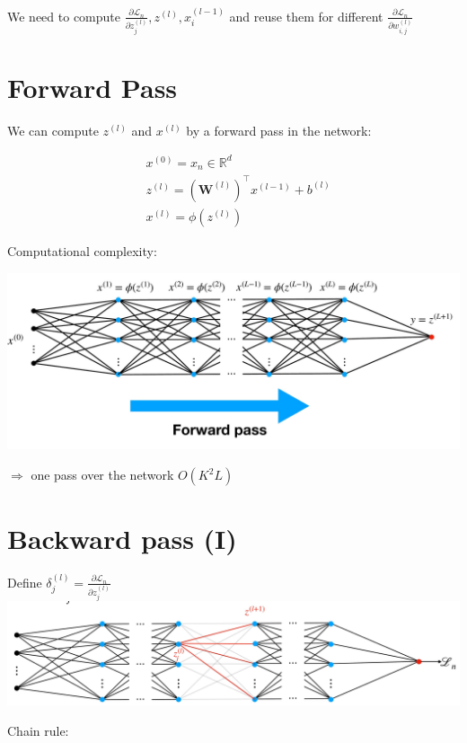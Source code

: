 \documentclass[10pt]{article}
\begin{document}
We need to compute $\frac{\partial \mathscr{L}_{n}}{\partial z_{j}^{(l)}}, z^{(l)}, x_{i}^{(l-1)}$ and reuse them for different $\frac{\partial \mathscr{L}_{n}}{\partial w_{i, j}^{(l)}}$

\section*{Forward Pass}
We can compute $z^{(l)}$ and $x^{(l)}$ by a forward pass in the network:

$$
\begin{aligned}
& x^{(0)}=x_{n} \in \mathbb{R}^{d} \\
& z^{(l)}=\left(\mathbf{W}^{(l)}\right)^{\top} x^{(l-1)}+b^{(l)} \\
& x^{(l)}=\phi\left(z^{(l)}\right)
\end{aligned}
$$

Computational complexity:

\begin{center}
\includegraphics[max width=\textwidth]{2023_12_30_360102aa01a03e5a4270g-15}
\end{center}

$\Rightarrow$ one pass over the network $O\left(K^{2} L\right)$

\section*{Backward pass (I)}
Define $\delta_{j}^{(l)}=\frac{\partial \mathscr{L}_{n}}{\partial z_{j}^{(l)}}$
\includegraphics[max width=\textwidth, center]{2023_12_30_360102aa01a03e5a4270g-16}

Chain rule:
\end{document}
